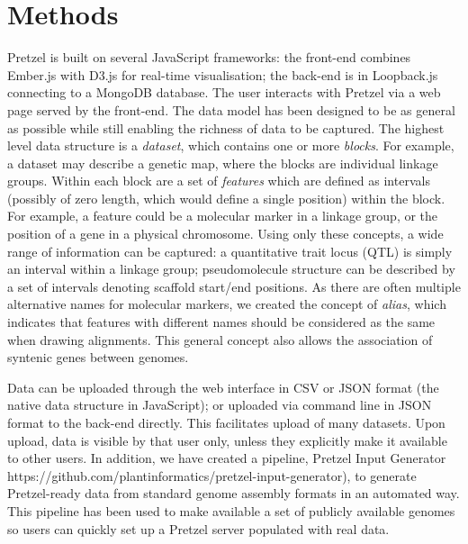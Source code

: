 \section{Methods}

Pretzel is built on several JavaScript frameworks: the front-end combines Ember.js with D3.js
  for real-time visualisation; the back-end is in Loopback.js connecting to a MongoDB database. 
%
The user interacts with Pretzel via a web page served by the front-end. 
%
The data model has been designed to be as general as possible while still enabling the richness of
  data to be captured. 
%
  The highest level data structure is a \textit{dataset}, which contains one or more \textit{blocks}.
%
For example, a dataset may describe a genetic map, where the blocks are individual linkage groups. 
%
  Within each block are a set of \textit{features} which are defined as intervals (possibly of zero length,
  which would define a single position) within the block. 
%
For example, a feature could be a molecular marker in a linkage group, or the position of a gene in
  a physical chromosome. 
%
Using only these concepts, a wide range of information can be captured: a quantitative trait locus
  (QTL) is simply an interval within a linkage group; pseudomolecule structure can be described by a
  set of intervals denoting scaffold start/end positions. 
%
As there are often multiple alternative names for molecular markers, we created the concept of
  \textit{alias}, which indicates that features with different names should be considered as the same when
  drawing alignments. 
%
This general concept also allows the association of syntenic genes between genomes.

Data can be uploaded through the web interface in CSV or JSON format (the native data structure in
  JavaScript); or uploaded via command line in JSON format to the back-end directly. 
%
This facilitates upload of many datasets. 
%
Upon upload, data is visible by that user only, unless they explicitly make it available to other
  users. 
%
In addition, we have created a pipeline, Pretzel Input Generator
  {{https://github.com/plantinformatics/pretzel-input-generator}}), to generate Pretzel-ready data
  from standard genome assembly formats in an automated way. This pipeline has been used to make
  available a set of publicly available genomes so users can quickly set up a Pretzel server
  populated with real data.

